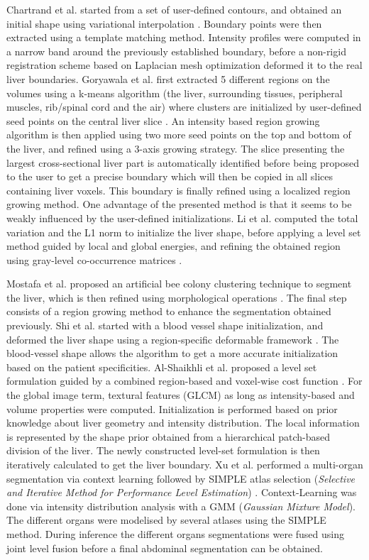 \documentclass[]{article}
\begin{document}
	Chartrand et al. started from a set of user-defined contours, and obtained an
	initial shape using variational interpolation \cite{Chartrand2014}. Boundary points were then
	extracted using a template matching method. Intensity profiles were
	computed in a narrow band around the previously established boundary,
	before a non-rigid registration scheme based on Laplacian mesh
	optimization deformed it to the real liver boundaries.
	Goryawala et al. first extracted 5 different regions on the volumes using
	a k-means algorithm (the liver, surrounding tissues, peripheral muscles,
	rib/spinal cord and the air) where clusters are initialized by
	user-defined seed points on the central liver slice \cite{Goryawala2014}. An intensity based
	region growing algorithm is then applied using two more seed points on
	the top and bottom of the liver, and refined using a 3-axis growing
	strategy. The slice presenting the largest cross-sectional liver part is
	automatically identified before being proposed to the user to get a
	precise boundary which will then be copied in all slices containing
	liver voxels. This boundary is finally refined using a localized region
	growing method. One advantage of the presented method is that it seems
	to be weakly influenced by the user-defined initializations. Li et al. computed the total variation and the L1 norm to initialize the
	liver shape, before applying a level set method guided by local and
	global energies, and refining the obtained region using gray-level
	co-occurrence matrices \cite{Li2014b}.
	
	Mostafa et al. proposed an artificial bee colony clustering technique to
	segment the liver, which is then refined using morphological operations \cite{Mostafa2015}.
	The final step consists of a region growing method to enhance the
	segmentation obtained previously.
	Shi et al. started with a blood vessel shape initialization, and deformed
	the liver shape using a region-specific deformable framework \cite{Shi2016}. The
	blood-vessel shape allows the algorithm to get a more accurate
	initialization based on the patient specificities. Al-Shaikhli et al. proposed a level set formulation guided by a combined region-based and
	voxel-wise cost function \cite{Al-Shaikhli2015}. For the global image term, textural features
	(GLCM) as long as intensity-based and volume properties were computed.
	Initialization is performed based on prior knowledge about liver
	geometry and intensity distribution. The local information is
	represented by the shape prior obtained from a hierarchical patch-based
	division of the liver. The newly constructed level-set formulation is
	then iteratively calculated to get the liver boundary.
	Xu et al. performed a multi-organ segmentation via context learning
	followed by SIMPLE atlas selection (\emph{Selective and Iterative Method
		for Performance Level Estimation}) \cite{Xu2015}. Context-Learning was done via
	intensity distribution analysis with a GMM (\emph{Gaussian Mixture
		Model}). The different organs were modelised by several atlases using
	the SIMPLE method. During inference the different organs segmentations
	were fused using joint level fusion before a final abdominal
	segmentation can be obtained.
	
\end{document}
